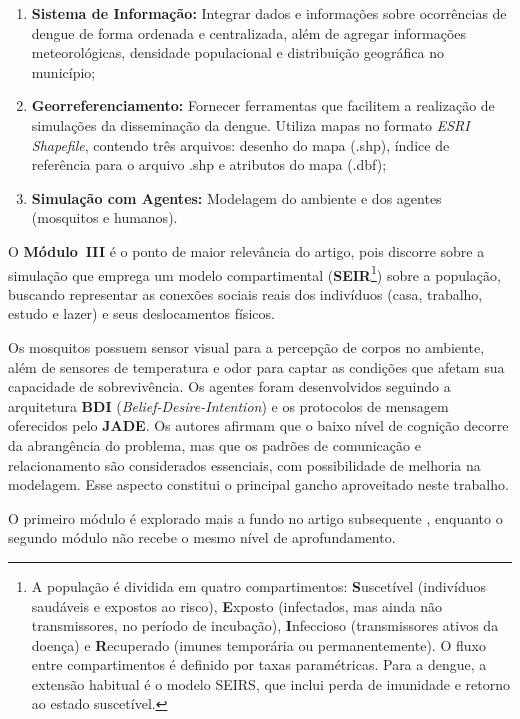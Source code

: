 \begin{apendicesenv}
\begin{enumerate}[label=\Roman*.]
    \item \textbf{Sistema de Informação:} Integrar dados e informações sobre
    ocorrências de dengue de forma ordenada e centralizada, além de agregar
    informações meteorológicas, densidade populacional e distribuição geográfica
    no município;
    \item \textbf{Georreferenciamento:} Fornecer ferramentas que facilitem a
    realização de simulações da disseminação da dengue. Utiliza mapas no formato
    \textit{ESRI Shapefile}, contendo três arquivos: desenho do mapa (.shp), índice
    de referência para o arquivo .shp e atributos do mapa (.dbf);
    \item \textbf{Simulação com Agentes:} Modelagem do ambiente e dos agentes
    (mosquitos e humanos).
\end{enumerate}

O \textbf{Módulo~III} é o ponto de maior relevância do artigo, pois discorre sobre a
simulação que emprega um modelo compartimental
(\textbf{SEIR}\footnote{A população é dividida em quatro compartimentos:
\textbf{S}uscetível (indivíduos saudáveis e expostos ao risco), \textbf{E}xposto
(infectados, mas ainda não transmissores, no período de incubação), \textbf{I}nfeccioso
(transmissores ativos da doença) e \textbf{R}ecuperado (imunes temporária ou
permanentemente). O fluxo entre compartimentos é definido por taxas paramétricas.
Para a dengue, a extensão habitual é o modelo SEIRS, que inclui perda de imunidade
e retorno ao estado suscetível.}) sobre a população, buscando representar as
conexões sociais reais dos indivíduos (casa, trabalho, estudo e lazer) e seus
deslocamentos físicos.

Os mosquitos possuem sensor visual para a percepção de corpos no ambiente, além
de sensores de temperatura e odor para captar as condições que afetam sua
capacidade de sobrevivência. Os agentes foram desenvolvidos seguindo a arquitetura
\textbf{BDI} (\textit{Belief-Desire-Intention}) e os protocolos de mensagem oferecidos
pelo \textbf{JADE}. Os autores afirmam
que o baixo nível de cognição decorre da abrangência do problema, mas que os padrões
de comunicação e relacionamento são considerados essenciais, com possibilidade de
melhoria na modelagem. Esse aspecto constitui o principal gancho aproveitado neste
trabalho.

O primeiro módulo é explorado mais a fundo no artigo subsequente
\cite{rizzi2016}, enquanto o segundo módulo não recebe o mesmo nível de
aprofundamento.


\end{apendicesenv}
